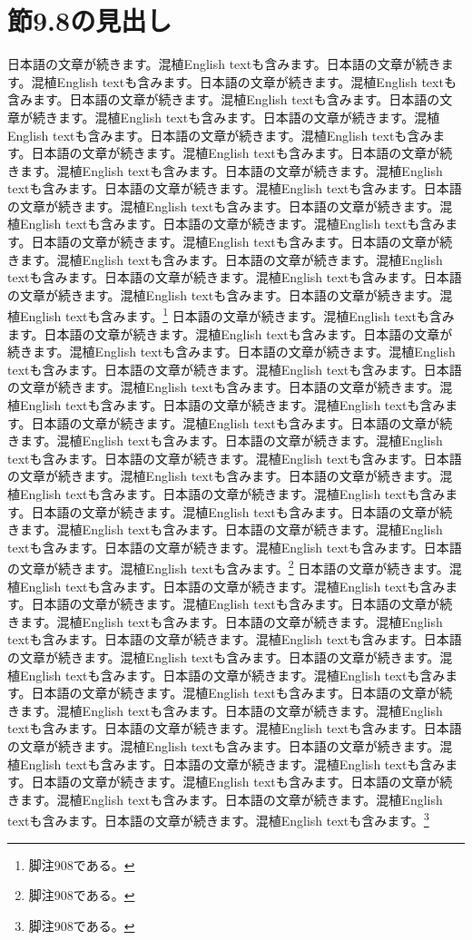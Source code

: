 \documentclass[pdflatex,book]{jlreq}
\begin{document}
\section{節9.8の見出し}
日本語の文章が続きます。混植English textも含みます。日本語の文章が続きます。混植English textも含みます。日本語の文章が続きます。混植English textも含みます。日本語の文章が続きます。混植English textも含みます。日本語の文章が続きます。混植English textも含みます。日本語の文章が続きます。混植English textも含みます。日本語の文章が続きます。混植English textも含みます。日本語の文章が続きます。混植English textも含みます。日本語の文章が続きます。混植English textも含みます。日本語の文章が続きます。混植English textも含みます。日本語の文章が続きます。混植English textも含みます。日本語の文章が続きます。混植English textも含みます。日本語の文章が続きます。混植English textも含みます。日本語の文章が続きます。混植English textも含みます。日本語の文章が続きます。混植English textも含みます。日本語の文章が続きます。混植English textも含みます。日本語の文章が続きます。混植English textも含みます。日本語の文章が続きます。混植English textも含みます。日本語の文章が続きます。混植English textも含みます。日本語の文章が続きます。混植English textも含みます。\footnote{脚注908である。}
日本語の文章が続きます。混植English textも含みます。日本語の文章が続きます。混植English textも含みます。日本語の文章が続きます。混植English textも含みます。日本語の文章が続きます。混植English textも含みます。日本語の文章が続きます。混植English textも含みます。日本語の文章が続きます。混植English textも含みます。日本語の文章が続きます。混植English textも含みます。日本語の文章が続きます。混植English textも含みます。日本語の文章が続きます。混植English textも含みます。日本語の文章が続きます。混植English textも含みます。日本語の文章が続きます。混植English textも含みます。日本語の文章が続きます。混植English textも含みます。日本語の文章が続きます。混植English textも含みます。日本語の文章が続きます。混植English textも含みます。日本語の文章が続きます。混植English textも含みます。日本語の文章が続きます。混植English textも含みます。日本語の文章が続きます。混植English textも含みます。日本語の文章が続きます。混植English textも含みます。日本語の文章が続きます。混植English textも含みます。日本語の文章が続きます。混植English textも含みます。\footnote{脚注908である。}
日本語の文章が続きます。混植English textも含みます。日本語の文章が続きます。混植English textも含みます。日本語の文章が続きます。混植English textも含みます。日本語の文章が続きます。混植English textも含みます。日本語の文章が続きます。混植English textも含みます。日本語の文章が続きます。混植English textも含みます。日本語の文章が続きます。混植English textも含みます。日本語の文章が続きます。混植English textも含みます。日本語の文章が続きます。混植English textも含みます。日本語の文章が続きます。混植English textも含みます。日本語の文章が続きます。混植English textも含みます。日本語の文章が続きます。混植English textも含みます。日本語の文章が続きます。混植English textも含みます。日本語の文章が続きます。混植English textも含みます。日本語の文章が続きます。混植English textも含みます。日本語の文章が続きます。混植English textも含みます。日本語の文章が続きます。混植English textも含みます。日本語の文章が続きます。混植English textも含みます。日本語の文章が続きます。混植English textも含みます。日本語の文章が続きます。混植English textも含みます。\footnote{脚注908である。}
\end{document}

